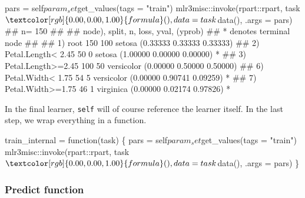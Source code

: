 \documentclass[]{article}
\newenvironment{Shaded}{}{}
\newcommand{\ControlFlowTok}[1]{\textcolor[rgb]{0.00,0.00,1.00}{#1}}
\newcommand{\DataTypeTok}[1]{#1}
\newcommand{\KeywordTok}[1]{\textcolor[rgb]{0.00,0.00,1.00}{#1}}
\newcommand{\NormalTok}[1]{#1}
\newcommand{\OperatorTok}[1]{#1}
\newcommand{\StringTok}[1]{\textcolor[rgb]{0.00,0.50,0.50}{#1}}
\renewenvironment{Shaded} {\begin{snugshade}\small} {\end{snugshade}}
\begin{document}
\begin{Shaded}
\begin{Highlighting}[]
\NormalTok{pars =}\StringTok{ }\NormalTok{self}\OperatorTok{$}\NormalTok{param_set}\OperatorTok{$}\KeywordTok{get_values}\NormalTok{(}\DataTypeTok{tags =} \StringTok{"train"}\NormalTok{)}
\NormalTok{mlr3misc}\OperatorTok{::}\KeywordTok{invoke}\NormalTok{(rpart}\OperatorTok{::}\NormalTok{rpart, task}\OperatorTok{$}\KeywordTok{formula}\NormalTok{(),}
    \DataTypeTok{data =}\NormalTok{ task}\OperatorTok{$}\KeywordTok{data}\NormalTok{(), }\DataTypeTok{.args =}\NormalTok{ pars)}
\NormalTok{## n= 150 }
\NormalTok{## }
\NormalTok{## node), split, n, loss, yval, (yprob)}
\NormalTok{##       * denotes terminal node}
\NormalTok{## }
\NormalTok{## 1) root 150 100 setosa (0.33333 0.33333 0.33333)  }
\NormalTok{##   2) Petal.Length< 2.45 50   0 setosa (1.00000 0.00000 0.00000) *}
\NormalTok{##   3) Petal.Length>=2.45 100  50 versicolor (0.00000 0.50000 0.50000)  }
\NormalTok{##     6) Petal.Width< 1.75 54   5 versicolor (0.00000 0.90741 0.09259) *}
\NormalTok{##     7) Petal.Width>=1.75 46   1 virginica (0.00000 0.02174 0.97826) *}
\end{Highlighting}
\end{Shaded}

In the final learner, \texttt{self} will of course reference the learner itself.
In the last step, we wrap everything in a function.

\begin{Shaded}
\begin{Highlighting}[]
\NormalTok{train_internal =}\StringTok{ }\ControlFlowTok{function}\NormalTok{(task) \{}
\NormalTok{  pars =}\StringTok{ }\NormalTok{self}\OperatorTok{$}\NormalTok{param_set}\OperatorTok{$}\KeywordTok{get_values}\NormalTok{(}\DataTypeTok{tags =} \StringTok{"train"}\NormalTok{)}
\NormalTok{  mlr3misc}\OperatorTok{::}\KeywordTok{invoke}\NormalTok{(rpart}\OperatorTok{::}\NormalTok{rpart, task}\OperatorTok{$}\KeywordTok{formula}\NormalTok{(),}
    \DataTypeTok{data =}\NormalTok{ task}\OperatorTok{$}\KeywordTok{data}\NormalTok{(), }\DataTypeTok{.args =}\NormalTok{ pars)}
\NormalTok{\}}
\end{Highlighting}
\end{Shaded}

\hypertarget{learner-predict}{%
\subsubsection{Predict function}\label{learner-predict}}
\end{document}
